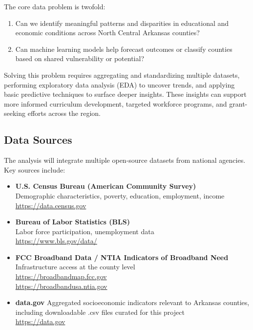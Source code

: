 \documentclass[12pt]{llncs}
\begin{document}
The core data problem is twofold:
\begin{enumerate}
    \item Can we identify meaningful patterns and disparities in educational and economic conditions across North Central Arkansas counties?
    \item Can machine learning models help forecast outcomes or classify counties based on shared vulnerability or potential?
\end{enumerate}
    
Solving this problem requires aggregating and standardizing multiple datasets, performing exploratory data analysis (EDA) to uncover trends, and applying basic predictive techniques to surface deeper insights. These insights can support more informed curriculum development, targeted workforce programs, and grant-seeking efforts across the region.

\subsection{Data Sources}
The analysis will integrate multiple open-source datasets from national agencies. Key sources include:

\begin{itemize}
    \item \textbf{U.S. Census Bureau (American Community Survey)} \\
    Demographic characteristics, poverty, education, employment, income \\
    \href{https://data.census.gov}{https://data.census.gov}

    \item \textbf{Bureau of Labor Statistics (BLS)} \\
    Labor force participation, unemployment data \\
    \href{https://www.bls.gov/data/}{https://www.bls.gov/data/}

    \item \textbf{FCC Broadband Data / NTIA Indicators of Broadband Need} \\
    Infrastructure access at the county level \\
    \href{https://broadbandmap.fcc.gov}{https://broadbandmap.fcc.gov} \\
    \href{https://broadbandusa.ntia.gov}{https://broadbandusa.ntia.gov}

    \item \textbf{data.gov}
    Aggregated socioeconomic indicators relevant to Arkansas counties, including downloadable .csv files curated for this project\\
    \href{ https://data.gov}{ https://data.gov}
    
\end{itemize}
\end{document}
